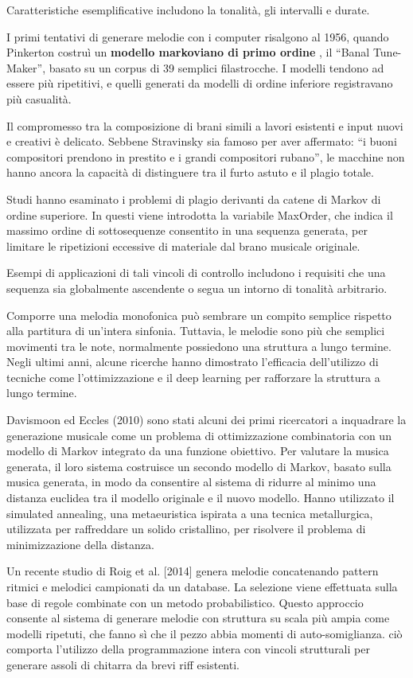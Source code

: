 \documentclass[a4paper,12pt]{report}
\begin{document}
Caratteristiche esemplificative includono la tonalità, gli intervalli e durate.

I primi tentativi di generare melodie con i computer risalgono al 1956, quando Pinkerton costruì un \textbf{modello markoviano di primo ordine} , il “Banal Tune-Maker”, basato su un corpus di 39 semplici filastrocche.
I modelli tendono ad essere più ripetitivi, e quelli generati da modelli di ordine inferiore registravano più casualità.

Il compromesso tra la composizione di brani simili a lavori esistenti e input nuovi e creativi è delicato. 
Sebbene Stravinsky sia famoso per aver affermato: “i buoni compositori prendono in prestito e i grandi compositori rubano”, 
le macchine non hanno ancora la capacità di distinguere tra il furto astuto e il plagio totale.

Studi hanno esaminato i problemi di plagio derivanti da catene di Markov di ordine superiore.
In questi viene introdotta la variabile MaxOrder, che indica il massimo ordine di sottosequenze consentito in una sequenza generata, per limitare le ripetizioni eccessive di materiale dal brano musicale originale.

Esempi di applicazioni di tali vincoli di controllo includono i requisiti che una sequenza sia globalmente ascendente o segua un intorno di tonalità arbitrario.

Comporre una melodia monofonica può sembrare un compito semplice rispetto alla partitura di un'intera sinfonia. 
Tuttavia, le melodie sono più che semplici movimenti tra le note, normalmente possiedono una struttura a lungo termine. 
Negli ultimi anni, alcune ricerche hanno dimostrato l’efficacia dell’utilizzo di tecniche come l’ottimizzazione e il deep learning per rafforzare la struttura a lungo termine.

Davismoon ed Eccles (2010) sono stati alcuni dei primi ricercatori a inquadrare la generazione musicale come un problema di ottimizzazione combinatoria con un modello di Markov integrato da una funzione obiettivo. 
Per valutare la musica generata, il loro sistema costruisce un secondo modello di Markov, basato sulla musica generata, in modo da consentire al sistema di ridurre al minimo una distanza euclidea tra il modello originale e il nuovo modello. 
Hanno utilizzato il simulated annealing, una metaeuristica ispirata a una tecnica metallurgica, utilizzata per raffreddare un solido cristallino, per risolvere il problema di minimizzazione della distanza. 

Un recente studio di Roig et al. [2014] genera melodie concatenando pattern ritmici e melodici campionati da un database. 
La selezione viene effettuata sulla base di regole combinate con un metodo probabilistico. 
Questo approccio consente al sistema di generare melodie con struttura su scala più ampia come modelli ripetuti, che fanno sì che il pezzo abbia momenti di auto-somiglianza.
ciò comporta l'utilizzo della programmazione intera con vincoli strutturali per generare assoli di chitarra da brevi riff esistenti.
\end{document}
